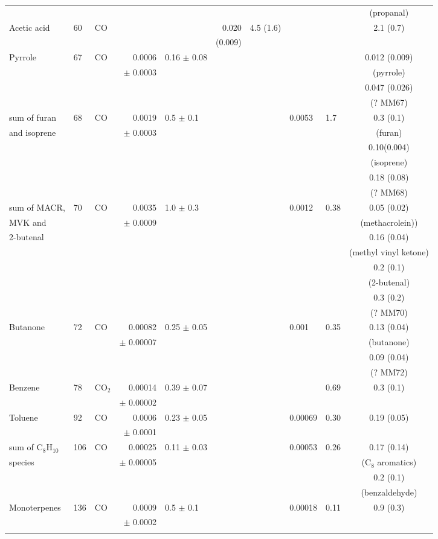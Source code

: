 \documentclass[acp, manuscript]{copernicus}
\begin{document}
\begin{supertabular}{l l l r l r l l l c}
  & &  & & & & & & & (propanal)\\
  Acetic acid & 60  &CO & & & 0.020 & 4.5 (1.6) & & & 2.1 (0.7) \\
  &&&&&(0.009)&&&&\\ [14mm]
  Pyrrole & 67 & CO & 0.0006 & 0.16 $\pm$ 0.08 & & & && 0.012 (0.009) \\
  &&&$\pm$ 0.0003&&&&&&(pyrrole) \\
  & & & & & & & & & 0.047 (0.026) \\
  & &  & & & & & & & (? MM67)\\
  sum of furan  & 68  & CO & 0.0019 & 0.5 $\pm$ 0.1 & & & 0.0053 & 1.7 & 0.3 (0.1)  \\ 
  and isoprene &&&$\pm$ 0.0003&&&&&& (furan)\\ 
  & &  & & &&&&&0.10(0.004) \\
  & &  & & &&&&&(isoprene)\\
  &&&&&&&&& 0.18 (0.08) \\
  &&&&&&&&& (? MM68)\\
  sum of MACR,   & 70 &CO & 0.0035 & 1.0 $\pm$ 0.3 & & & 0.0012 & 0.38 & 0.05 (0.02)  \\ 
  MVK and  & &  & $\pm$ 0.0009 & && & & & (methacrolein)) \\
  2-butenal&&&&&&&&&0.16 (0.04) \\
  &&&&&&&&& (methyl vinyl ketone) \\
  &&&&&&&&& 0.2 (0.1) \\
  &&&&&&&&& (2-butenal)\\
  &&&&&&&&& 0.3 (0.2) \\
  &&&&&&&&& (? MM70) \\
  Butanone & 72 & CO & 0.00082 & 0.25 $\pm$ 0.05& & & 0.001 & 0.35 & 0.13 (0.04)  \\ 
  &&&$\pm$ 0.00007&&&&&& (butanone) \\
  &&&&&&&&&0.09 (0.04) \\
  &&&&&&&&&(? MM72)\\
  Benzene & 78 &CO$_2$ & 0.00014 & 0.39 $\pm$ 0.07 & & & & 0.69 & 0.3 (0.1) \\
  &&&$\pm$ 0.00002&&&&&&\\
  Toluene & 92 & CO & 0.0006 & 0.23 $\pm$ 0.05 & & &0.00069 &0.30 & 0.19 (0.05) \\ 
  &&&$\pm$ 0.0001&&&&&&\\
  sum of C$_8$H$_{10}$  & 106 & CO & 0.00025 & 0.11 $\pm$ 0.03 & & & 0.00053 & 0.26 & 0.17 (0.14)  \\
  species &&&$\pm$ 0.00005&&&&&  & (C$_8$ aromatics) \\
  &&&&&&&& &0.2 (0.1) \\
  &&&&&&&&&(benzaldehyde)\\
  Monoterpenes & 136 &CO & 0.0009 & 0.5 $\pm$ 0.1& & &0.00018 & 0.11 & 0.9 (0.3) \\
  &&&$\pm$ 0.0002&&&&&& \\
  \bottomhline
  \label{table:comp} 
  \belowtable{} &&&&&&&&&\\
\end{supertabular}
\end{document}
